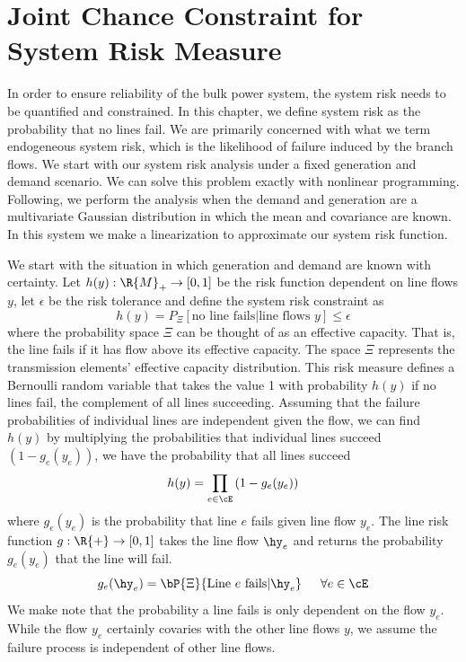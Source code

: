 \section{Joint Chance Constraint for System Risk Measure} \label{jointchanceconstraint}
In order to ensure reliability of the bulk power system, the system risk needs to be quantified and constrained. In this chapter, we define system risk as the probability that no lines fail.  We are primarily concerned with what we term endogeneous system risk, which is the likelihood of failure induced by the branch flows.  We start with our system risk analysis under a fixed generation and demand scenario.  We can solve this problem exactly with nonlinear programming.  Following, we perform the analysis when the demand and generation are a multivariate Gaussian distribution in which the mean and covariance are known.  In this system we make a linearization to approximate our system risk function.   

We start with the situation in which generation and demand are known with certainty.  Let $h(y) : \R{M}_+ \rightarrow \left[ 0, 1 \right]$ be the risk function dependent on line flows $y$, let $\epsilon$ be the risk tolerance and define the system risk constraint as
\begin{equation}\label{systemriskmeasure}
h(y) = P_\Xi \left[ \mbox{no line fails} | \mbox{line flows } y\right] \leq \epsilon
\end{equation}
where the probability space $\Xi$  can be thought of as an effective capacity.  That is, the line fails if it has flow above its effective capacity.  The space $\Xi$ represents the transmission elements' effective capacity distribution.  
This risk measure  defines a Bernoulli random variable that takes the value 1 with probability $h(y)$ if no lines fail, the complement of all lines succeeding.  Assuming that the failure probabilities of individual lines are independent given the flow, we can find $h(y)$ by multiplying the probabilities that individual lines succeed $(1-g_e(y_e))$, we have the probability that all lines succeed
\begin{equation}  \label{nofail}
h(y) = \prod_{e \in \cE} \left( 1 - g_e(y_e) \right)
\end{equation}  
where $g_e(y_e)$ is the probability that line $e$ fails given line flow $y_e$.   The line risk function $g : \R{+} \rightarrow [0,1]$ takes the line flow $\hy_e$ and returns the probability $g_e(y_e)$ that the line will fail.   
\begin{equation}
 g_e(\hy_e) = \bP{\Xi}{\text{Line }e\text{ fails} | \hy_e}  \hspace{15px} \forall e \in \cE
\end{equation}
We make note that the probability a line fails is only dependent on the flow $y_e$.  While the flow $y_e$ certainly covaries with the other line flows $y$, we assume the failure process is independent of other line flows.

